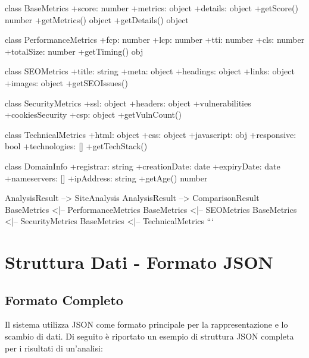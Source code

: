     class BaseMetrics {
        +score: number
        +metrics: object
        +details: object
        +getScore() number
        +getMetrics() object
        +getDetails() object
    }
    
    class PerformanceMetrics {
        +fcp: number
        +lcp: number
        +tti: number
        +cls: number
        +totalSize: number
        +getTiming() obj
    }
    
    class SEOMetrics {
        +title: string
        +meta: object
        +headings: object
        +links: object
        +images: object
        +getSEOIssues()
    }
    
    class SecurityMetrics {
        +ssl: object
        +headers: object
        +vulnerabilities
        +cookiesSecurity
        +csp: object
        +getVulnCount()
    }
    
    class TechnicalMetrics {
        +html: object
        +css: object
        +javascript: obj
        +responsive: bool
        +technologies: []
        +getTechStack()
    }
    
    class DomainInfo {
        +registrar: string
        +creationDate: date
        +expiryDate: date
        +nameservers: []
        +ipAddress: string
        +getAge() number
    }
    
    AnalysisResult --> SiteAnalysis
    AnalysisResult --> ComparisonResult
    BaseMetrics <|-- PerformanceMetrics
    BaseMetrics <|-- SEOMetrics
    BaseMetrics <|-- SecurityMetrics
    BaseMetrics <|-- TechnicalMetrics
```

\section{Struttura Dati - Formato JSON}

\subsection{Formato Completo}
Il sistema utilizza JSON come formato principale per la rappresentazione e lo scambio di dati. Di seguito è riportato un esempio di struttura JSON completa per i risultati di un'analisi:


